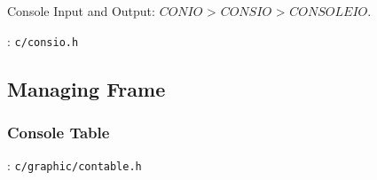 
Console Input and Output: $CONIO$ > $CONSIO$ > $CONSOLEIO$.

: \verb`c/consio.h`

\subsection{Managing Frame}

\subsubsection{Console Table}
: \verb`c/graphic/contable.h`

